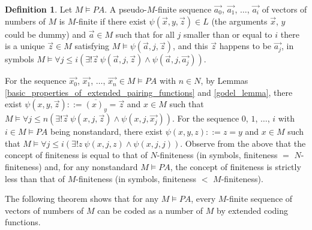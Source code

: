 \documentclass[a4paper,11pt]{article}
\begin{document}
\theoremstyle{definition}
\newtheorem{definition_of_M_finiteness}[definition_of_pseudo_M_finiteness]{Definition}
\begin{definition_of_M_finiteness}\label{definition_of_M_finiteness}
  Let $M\models PA$. A pseudo-$M$-finite sequence $\vec{a_0}$, $\vec{a_1}$, $\ldots$, $\vec{a_i}$ of vectors of numbers of $M$ is $M$-finite if there exist $\psi(\vec{x},y,\vec{z}) \in L$ (the arguments $\vec{x}$, $y$ could be dummy) and $\vec{a}\in M$ such that for all $j$ smaller than or equal to $i$ there is a unique $\vec{z}\in M$ satisfying $M\models \psi(\vec{a},j,\vec{z})$, and this $\vec{z}$ happens to be $\vec{a_j}$, in symbols $M\models \forall j\leq i ( \exists! \vec{z}\ \psi(\vec{a},j,\vec{z}) \wedge \psi(\vec{a},j,\vec{a_j}) )$.
\end{definition_of_M_finiteness}

For the sequence $\vec{x_0}$, $\vec{x_1}$, $\ldots$, $\vec{x_n}\in M\models PA$ with $n\in N$, by Lemmas \ref{basic_properties_of_extended_pairing_functions} and \ref{godel_lemma}, there exist $\psi(x,y,\vec{z}) ::= \overline{(x)_y} =  \vec{z}$ and $x\in M$ such that $M\models \forall j\leq n ( \exists! \vec{z}\ \psi(x,j,\vec{z}) \wedge \psi(x,j,\vec{x_j}) )$.  For the sequence $0$, $1$, $\ldots$, $i$ with $i\in M\models PA$ being nonstandard, there exist $\psi(x,y,z) ::= z = y$ and $x\in M$ such that $M\models \forall j\leq i ( \exists! z\ \psi(x,j,z) \wedge \psi(x,j,j) )$. Observe from the above that the concept of finiteness is equal to that of $N$-finiteness (in symbols, finiteness $=$ $N$-finiteness) and, for any nonstandard $M\models PA$, the concept of finiteness is strictly less than that of $M$-finiteness (in symbols, finiteness $<$ $M$-finiteness).

The following theorem shows that for any $M\models PA$, every $M$-finite sequence of vectors of numbers of $M$ can be coded as a number of $M$ by extended coding functions.
\end{document}
